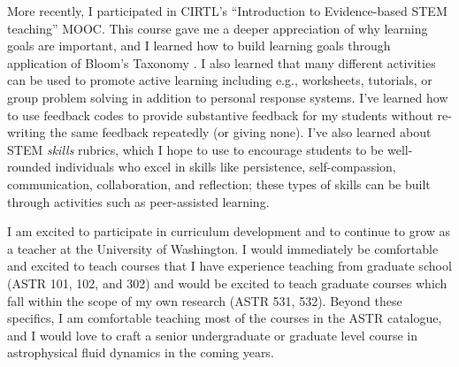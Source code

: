 \documentclass[11pt]{article}
\begin{document}
More recently, I participated in CIRTL's ``Introduction to Evidence-based STEM teaching'' MOOC.
This course gave me a deeper appreciation of why learning goals are important, and I learned how to build learning goals through application of Bloom's Taxonomy \citep{simon_taylor_2008}.
I also learned that many different activities can be used to promote active learning including e.g., worksheets, tutorials, or group problem solving in addition to personal response systems.
I've learned how to use feedback codes to provide substantive feedback for my students without re-writing the same feedback repeatedly (or giving none).
I've also learned about STEM \emph{skills} rubrics, which I hope to use to encourage students to be well-rounded individuals who excel in skills like persistence, self-compassion, communication, collaboration, and reflection; these types of skills can be built through activities such as peer-assisted learning.


I am excited to participate in curriculum development and to continue to grow as a teacher at the University of Washington.
I would immediately be comfortable and excited to teach courses that I have experience teaching from graduate school (ASTR 101, 102, and 302) and would be excited to teach graduate courses which fall within the scope of my own research (ASTR 531, 532).
Beyond these specifics, I am comfortable teaching most of the courses in the ASTR catalogue, and I would love to craft a senior undergraduate or graduate level course in astrophysical fluid dynamics in the coming years.


{\scriptsize

}
\end{document}
